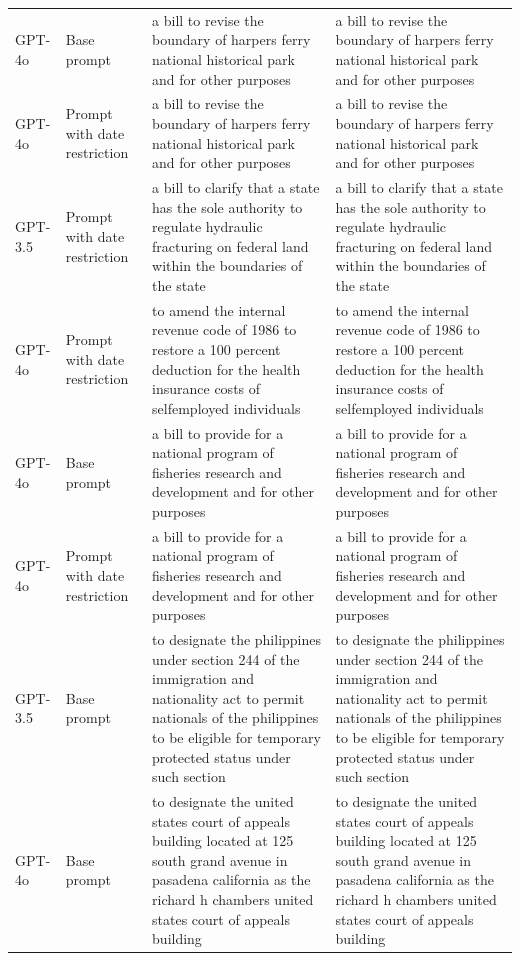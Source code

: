 \begin{longtable}{>{\raggedright\arraybackslash}p{1.4cm}>{\raggedright\arraybackslash}p{1.4cm}>{\raggedright\arraybackslash}p{5.5cm}>{\raggedright\arraybackslash}p{5.5cm}}
GPT-4o & Base prompt & a bill to revise the boundary of harpers ferry national historical park and for other purposes & a bill to revise the boundary of harpers ferry national historical park and for other purposes\\
GPT-4o & Prompt with date restriction & a bill to revise the boundary of harpers ferry national historical park and for other purposes & a bill to revise the boundary of harpers ferry national historical park and for other purposes\\
GPT-3.5 & Prompt with date restriction & a bill to clarify that a state has the sole authority to regulate hydraulic fracturing on federal land within the boundaries of the state & a bill to clarify that a state has the sole authority to regulate hydraulic fracturing on federal land within the boundaries of the state\\
GPT-4o & Prompt with date restriction & to amend the internal revenue code of 1986 to restore a 100 percent deduction for the health insurance costs of selfemployed individuals & to amend the internal revenue code of 1986 to restore a 100 percent deduction for the health insurance costs of selfemployed individuals\\
GPT-4o & Base prompt & a bill to provide for a national program of fisheries research and development and for other purposes & a bill to provide for a national program of fisheries research and development and for other purposes\\
GPT-4o & Prompt with date restriction & a bill to provide for a national program of fisheries research and development and for other purposes & a bill to provide for a national program of fisheries research and development and for other purposes\\
GPT-3.5 & Base prompt & to designate the philippines under section 244 of the immigration and nationality act to permit nationals of the philippines to be eligible for temporary protected status under such section & to designate the philippines under section 244 of the immigration and nationality act to permit nationals of the philippines to be eligible for temporary protected status under such section\\
GPT-4o & Base prompt & to designate the united states court of appeals building located at 125 south grand avenue in pasadena california as the richard h chambers united states court of appeals building & to designate the united states court of appeals building located at 125 south grand avenue in pasadena california as the richard h chambers united states court of appeals building\\

\end{longtable}
